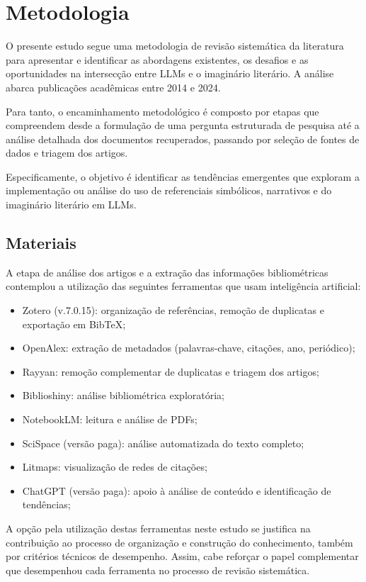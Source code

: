 \documentclass[portuguese]{textolivre}
\begin{document}
\section{Metodologia}
O presente estudo segue uma metodologia de revisão sistemática da literatura para apresentar e identificar as abordagens existentes, os desafios e as oportunidades na intersecção entre LLMs e o imaginário literário. A análise abarca publicações acadêmicas entre 2014 e 2024.

Para tanto, o encaminhamento metodológico é composto por etapas que compreendem desde a formulação de uma pergunta estruturada de pesquisa até a análise detalhada dos documentos recuperados, passando por seleção de fontes de dados e triagem dos artigos.

Especificamente, o objetivo é identificar as tendências emergentes que exploram a implementação ou análise do uso de referenciais simbólicos, narrativos e do imaginário literário em LLMs.

\subsection{Materiais}
A etapa de análise dos artigos e a extração das informações bibliométricas contemplou a utilização das seguintes ferramentas que usam inteligência artificial:

\begin{itemize}
    \item Zotero (v.7.0.15): organização de referências, remoção de duplicatas e exportação em BibTeX;
    \item OpenAlex: extração de metadados (palavras-chave, citações, ano, periódico);
    \item Rayyan: remoção complementar de duplicatas e triagem dos artigos;
    \item Biblioshiny: análise bibliométrica exploratória;
    \item NotebookLM: leitura e análise de PDFs;
    \item SciSpace (versão paga): análise automatizada do texto completo;
    \item Litmaps: visualização de redes de citações;
    \item ChatGPT (versão paga): apoio à análise de conteúdo e identificação de tendências;
\end{itemize}

A opção pela utilização destas ferramentas neste estudo se justifica na contribuição ao processo de organização e construção do conhecimento, também por critérios técnicos de desempenho. Assim, cabe reforçar o papel complementar que desempenhou cada ferramenta no processo de revisão sistemática.
\end{document}
